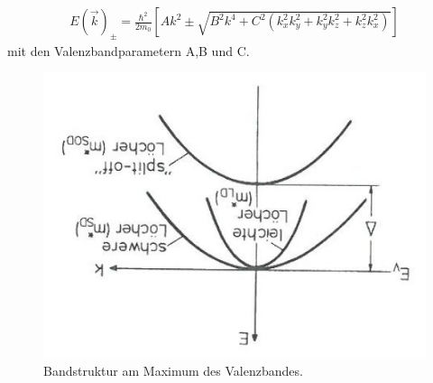 \documentclass[a4paper,12pt]{article}
\begin{document}
\begin{align}
E(\vec{k})_{\pm}=\frac{\hbar^2}{2m_0}\left[Ak^2\pm \sqrt{B^2k^4+C^2(k_x^2 k_y^2+k_y^2 k_z^2+k_z^2 k_x^2)}\right]
\end{align}
mit den Valenzbandparametern A,B und C.
\begin{figure}[h]
\begin{center}
\includegraphics[angle=180,scale=0.6]{Valenzband_Entartung.jpeg}
\caption{Bandstruktur am Maximum des Valenzbandes.}
\label{fig:valence_degen}
\end{center}
\end{figure}
\end{document}
